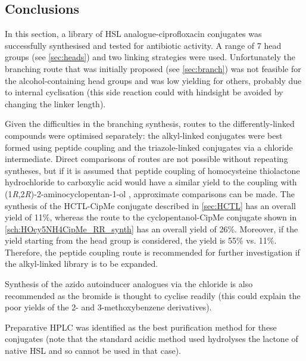 \subsection{Conclusions}

In this section, a library of HSL analogue-ciprofloxacin conjugates was successfully synthesised and tested for antibiotic activity.
A range of 7 head groups (see \ref{sec:heads}) and two linking strategies were used.
Unfortunately the branching route that was initially proposed (see \ref{sec:branch}) was not feasible for the alcohol-containing head groups and was low yielding for others, probably due to internal cyclisation (this side reaction could with hindsight be avoided by changing the linker length).

Given the difficulties in the branching synthesis, routes to the differently-linked compounds were optimised separately: the alkyl-linked conjugates were best formed using peptide coupling and the triazole-linked conjugates via a chloride intermediate. 
Direct comparisons of routes are not possible without repeating syntheses, but if it is assumed that peptide coupling of homocysteine thiolactone hydrochloride  to carboxylic acid  would have a similar yield to the coupling with (1\textit{R},2\textit{R})-2-aminocyclopentan-1-ol , approximate comparisons can be made.
The synthesis of the HCTL-CipMe conjugate  described in \ref{sec:HCTL} has an overall yield of 11\%, whereas the route to the cyclopentanol-CipMe conjugate  shown in \ref{sch:HOcy5NH4CipMe_RR_synth} has an overall yield of 26\%. Moreover, if the yield starting from the head group is considered, the yield is 55\% vs. 11\%.
Therefore, the peptide coupling route is recommended for further investigation if the alkyl-linked library is to be expanded.

Synthesis of the azido autoinducer analogues via the chloride is also recommended as the bromide is thought to cyclise readily (this could explain the poor yields of the 2- and 3-methoxybenzene derivatives).

Preparative HPLC was identified as the best purification method for these conjugates (note that the standard acidic method used hydrolyses the lactone of native HSL and so cannot be used in that case).



